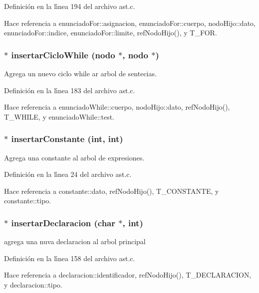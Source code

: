 Definici\'{o}n en la l\'{\i}nea 194 del archivo ast.c.

Hace referencia a enunciado\-For::asignacion, enunciado\-For::cuerpo, nodo\-Hijo::dato, enunciado\-For::indice, enunciado\-For::limite, ref\-Nodo\-Hijo(), y T\_\-FOR.
\subsubsection{$\ast$ insertar\-Ciclo\-While ({\bf nodo} $\ast$, {\bf nodo} $\ast$)}\label{ast_8h_a26}


Agrega un nuevo ciclo while ar arbol de sentecias. 



Definici\'{o}n en la l\'{\i}nea 183 del archivo ast.c.

Hace referencia a enunciado\-While::cuerpo, nodo\-Hijo::dato, ref\-Nodo\-Hijo(), T\_\-WHILE, y enunciado\-While::test.
\subsubsection{$\ast$ insertar\-Constante (int, int)}\label{ast_8h_a17}


Agrega una constante al arbol de expresiones. 



Definici\'{o}n en la l\'{\i}nea 24 del archivo ast.c.

Hace referencia a constante::dato, ref\-Nodo\-Hijo(), T\_\-CONSTANTE, y constante::tipo.
\subsubsection{$\ast$ insertar\-Declaracion (char $\ast$, int)}\label{ast_8h_a24}


agrega una nuva declaracion al arbol principal 



Definici\'{o}n en la l\'{\i}nea 158 del archivo ast.c.

Hace referencia a declaracion::identificador, ref\-Nodo\-Hijo(), T\_\-DECLARACION, y declaracion::tipo.
